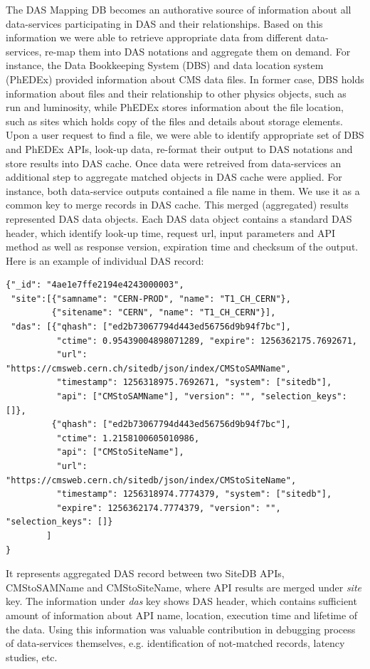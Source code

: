 \documentclass[a4paper]{jpconf}
\begin{document}
The DAS Mapping DB becomes an authorative
source of information about all data-services participating in DAS and their
relationships. Based on this information we were able to retrieve appropriate data
from different data-services, re-map them into DAS notations and
aggregate them on demand.
For instance, the Data Bookkeeping System (DBS) and data location system (PhEDEx)
provided information about CMS data files. In former case, DBS holds information about
files and their relationship to other physics objects, such as run and luminosity, 
while PhEDEx stores information about the file location, such as sites which
holds copy of the files and details about storage elements.
Upon a user request to find a file, we were able to identify appropriate set of
DBS and PhEDEx APIs, look-up data, re-format their output to DAS notations and
store results into DAS cache.
Once data were retreived from data-services an additional step to aggregate
matched objects in DAS cache were applied. For instance, both data-service outputs 
contained a file name in them. We use it as a common key to merge records in DAS cache.
This merged (aggregated) results represented DAS data objects. Each DAS data
object contains a standard DAS header, which identify look-up time,
request url, input parameters and API method as well as response version, expiration
time and checksum of the output. Here is an example of individual DAS record:
\begin{verbatim}
{"_id": "4ae1e7ffe2194e4243000003", 
 "site":[{"samname": "CERN-PROD", "name": "T1_CH_CERN"}, 
         {"sitename": "CERN", "name": "T1_CH_CERN"}], 
 "das": [{"qhash": ["ed2b73067794d443ed56756d9b94f7bc"], 
          "ctime": 0.95439004898071289, "expire": 1256362175.7692671, 
          "url": "https://cmsweb.cern.ch/sitedb/json/index/CMStoSAMName", 
          "timestamp": 1256318975.7692671, "system": ["sitedb"], 
          "api": ["CMStoSAMName"], "version": "", "selection_keys": []}, 
         {"qhash": ["ed2b73067794d443ed56756d9b94f7bc"], 
          "ctime": 1.2158100605010986, 
          "api": ["CMStoSiteName"], 
          "url": "https://cmsweb.cern.ch/sitedb/json/index/CMStoSiteName", 
          "timestamp": 1256318974.7774379, "system": ["sitedb"], 
          "expire": 1256362174.7774379, "version": "", "selection_keys": []}
        ]
}
\end{verbatim}
It represents aggregated DAS record between two SiteDB APIs, CMStoSAMName and
CMStoSiteName, where API results are merged under {\it site} key. The information
under {\it das} key shows DAS header, which contains sufficient amount of
information about API name, location, execution time and lifetime of the data.
Using this information was valuable contribution in debugging process of
data-services themselves, e.g. identification of not-matched records, 
latency studies, etc.
\end{document}
